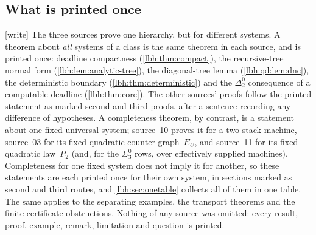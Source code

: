 \documentclass[11pt,letterpaper]{article}
\theoremstyle{definition}
\theoremstyle{remark}
\newcommand{\sig}[1]{\Sigma^{0}_{#1}}
\newcommand{\1}{\mathbf 1}
\newcommand{\wtag}{\textup{[write]}}%
\begin{document}
\subsection{What is printed once}\label{lbh:conv:union}
\wtag{} The three sources prove one hierarchy, but for different systems. A theorem about
\emph{all} systems of a class is the same theorem in each source, and is printed once:
deadline compactness (\cref{lbh:thm:compact}), the recursive-tree normal form
(\cref{lbh:lem:analytic-tree}), the diagonal-tree lemma (\cref{lbh:qd:lem:dnc}), the
deterministic boundary (\cref{lbh:thm:deterministic}) and the $\Delta^0_2$ consequence of a
computable deadline (\cref{lbh:thm:core}). The other sources' proofs follow the printed statement
as marked second and third proofs, after a sentence recording any difference of hypotheses.
A completeness theorem, by contrast, is a statement about one fixed universal system; source~10
proves it for a two-stack machine, source~03 for its fixed quadratic counter graph~$E_U$, and
source~11 for its fixed quadratic law~$P_2$ (and, for the $\sig3$ rows, over effectively
supplied machines). Completeness for one fixed system does not imply it for another, so these
statements are each printed once for their own system, in sections marked as second and third
routes, and \cref{lbh:sec:onetable} collects all of them in one table. The same applies to the
separating examples, the transport theorems and the finite-certificate obstructions. Nothing of
any source was omitted: every result, proof, example, remark, limitation and question is
printed.
\end{document}
